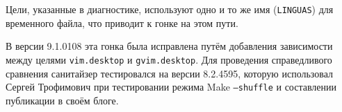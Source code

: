 

Цели, указанные в диагностике, используют одно и то же имя (\texttt{LINGUAS}) для временного файла, что приводит к гонке на этом пути.

В версии 9.1.0108 эта гонка была исправлена путём добавления зависимости между целями \texttt{vim.desktop} и \texttt{gvim.desktop}. Для проведения справедливого сравнения санитайзер тестировался на версии 8.2.4595, которую использовал Сергей Трофимович при тестировании режима Make \texttt{--shuffle} и составлении публикации в своём блоге.

